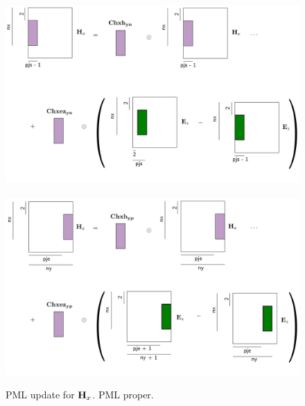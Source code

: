 \documentclass[a4paper,12pt]{article}
\begin{document}
%
%
\begin{figure}
\centering
\includegraphics[width=1\textwidth]{../pics/tikz/svg/pml-color/Hx-pml-yn.pdf}
~
\includegraphics[width=1\textwidth]{../pics/tikz/svg/pml-color/Hx-pml-yp.pdf}
\caption{PML update for ${\bf H}_x$. PML proper.}
\end{figure}
%
\end{document}

